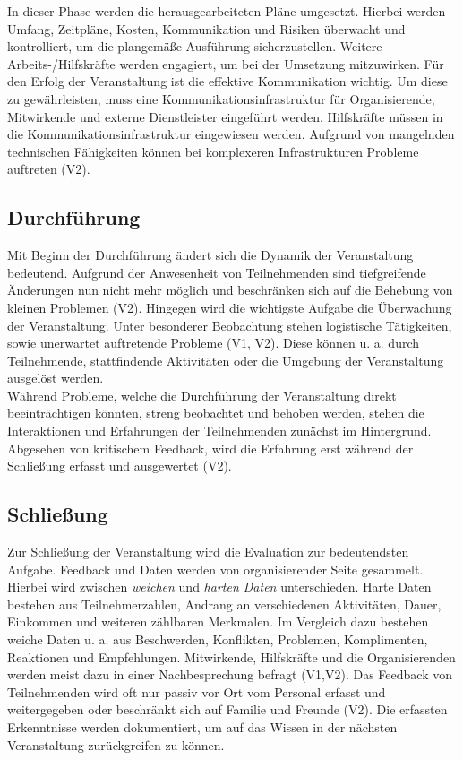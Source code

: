 In dieser Phase werden die herausgearbeiteten Pläne umgesetzt. Hierbei werden
Umfang, Zeitpläne, Kosten, Kommunikation und Risiken überwacht und kontrolliert,
um die plangemäße Ausführung sicherzustellen. Weitere Arbeits-/Hilfskräfte
werden engagiert, um bei der Umsetzung mitzuwirken. Für den Erfolg der
Veranstaltung ist die effektive Kommunikation wichtig. Um diese zu
gewährleisten, muss eine Kommunikationsinfrastruktur für Organisierende,
Mitwirkende und externe Dienstleister eingeführt werden. Hilfskräfte müssen in
die Kommunikationsinfrastruktur eingewiesen werden. Aufgrund von mangelnden
technischen Fähigkeiten können bei komplexeren Infrastrukturen Probleme
auftreten (V2).

\subsection{Durchführung} \label{sec:analysis-org-durchfuehrung}

Mit Beginn der Durchführung ändert sich die Dynamik der Veranstaltung bedeutend.
Aufgrund der Anwesenheit von Teilnehmenden sind tiefgreifende Änderungen nun
nicht mehr möglich und beschränken sich auf die Behebung von kleinen Problemen
(V2). Hingegen wird die wichtigste Aufgabe die Überwachung der Veranstaltung.
Unter besonderer Beobachtung stehen logistische Tätigkeiten, sowie unerwartet
auftretende Probleme (V1, V2). Diese können u. a. durch Teilnehmende,
stattfindende Aktivitäten oder die Umgebung der Veranstaltung ausgelöst werden.
\\
Während Probleme, welche die Durchführung der Veranstaltung direkt
beeinträchtigen könnten, streng beobachtet und behoben werden, stehen die
Interaktionen und Erfahrungen der Teilnehmenden zunächst im Hintergrund.
Abgesehen von kritischem Feedback, wird die Erfahrung erst während der
Schließung erfasst und ausgewertet (V2).

\subsection{Schließung} \label{sec:analysis-org-schliessung}


Zur Schließung der Veranstaltung wird die Evaluation zur bedeutendsten Aufgabe.
Feedback und Daten werden von organisierender Seite gesammelt. Hierbei wird
zwischen \textit{weichen} und \textit{harten Daten} unterschieden. Harte Daten
bestehen aus Teilnehmerzahlen, Andrang an verschiedenen Aktivitäten, Dauer,
Einkommen und weiteren zählbaren Merkmalen. Im Vergleich dazu bestehen weiche
Daten u. a. aus Beschwerden, Konflikten, Problemen, Komplimenten, Reaktionen und
Empfehlungen. Mitwirkende, Hilfskräfte und die Organisierenden werden meist dazu
in einer Nachbesprechung befragt (V1,V2). Das Feedback von Teilnehmenden wird
oft nur passiv vor Ort vom Personal erfasst und weitergegeben oder beschränkt
sich auf Familie und Freunde (V2). Die erfassten Erkenntnisse werden
dokumentiert, um auf das Wissen in der nächsten Veranstaltung zurückgreifen zu
können.


